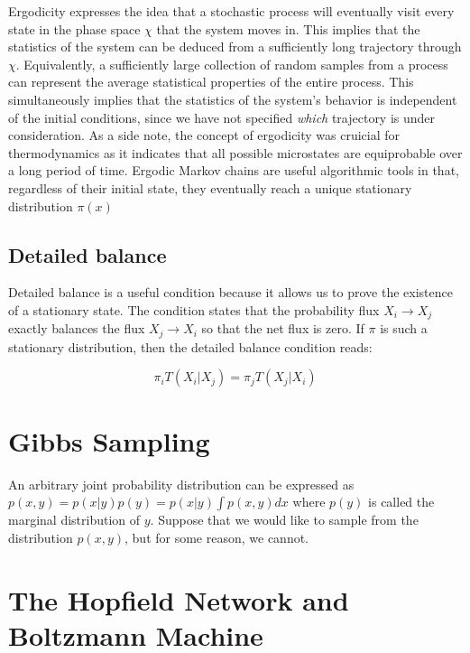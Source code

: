 \documentclass{article}
\begin{document}
Ergodicity expresses the idea that a stochastic process will eventually visit every state in the phase space $\chi$ that the system moves in. This implies that the statistics of the system can be deduced from a sufficiently long trajectory through $\chi$. Equivalently, a sufficiently large collection of random samples from a process can represent the average statistical properties of the entire process. This simultaneously implies that the statistics of the system's behavior is independent of the initial conditions, since we have not specified \emph{which} trajectory is under consideration. As a side note, the concept of ergodicity was cruicial for thermodynamics as it indicates that all possible microstates are equiprobable over a long period of time. Ergodic Markov chains are useful algorithmic tools in that, regardless of their initial state, they eventually reach a unique stationary distribution $\pi(x)$

\subsection{Detailed balance}

Detailed balance is a useful condition because it allows us to prove the existence of a stationary state. The condition states that the probability flux $X_{i}\rightarrow X_{j}$ exactly balances the flux $X_{j}\rightarrow X_{i}$ so that the net flux is zero. If $\pi$ is such a stationary distribution, then the detailed balance condition reads: 

\begin{equation}
\pi_{i}T(X_{i}|X_{j}) = \pi_{j}T(X_{j}|X_{i})
\end{equation} 

\section{Gibbs Sampling}

An arbitrary joint probability distribution can be expressed as $p(x,y) = p(x|y)p(y) = p(x|y)\int p(x,y)dx$ where $p(y)$ is called the marginal distribution of $y$. Suppose that we would like to sample from the distribution $p(x,y)$, but for some reason, we cannot. 

\section{The Hopfield Network and Boltzmann Machine}
\end{document}
